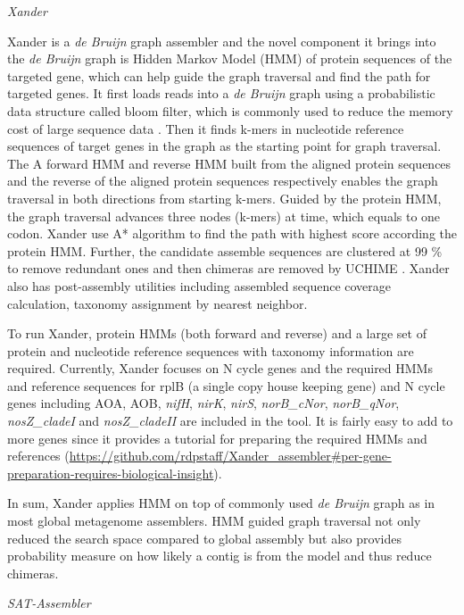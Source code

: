 \documentclass[]{msu-thesis}
\begin{document}
\textit{Xander}

Xander is a \textit{de Bruijn} graph assembler and the novel component
it brings into the \textit{de Bruijn} graph is Hidden Markov Model
(HMM) of protein sequences of the targeted gene, which can help guide
the graph traversal and find the path for targeted genes. It first
loads reads into a \textit{de Bruijn} graph using a probabilistic data
structure called bloom filter, which is commonly used to reduce the
memory cost of large sequence data \cite{pell_scaling_2012}. Then it
finds k-mers in nucleotide reference sequences of target genes in the
graph as the starting point for graph traversal. The A forward HMM and
reverse HMM built from the aligned protein sequences and the reverse
of the aligned protein sequences respectively enables the graph
traversal in both directions from starting k-mers. Guided by the
protein HMM, the graph traversal advances three nodes (k-mers) at
time, which equals to one codon. Xander use A* algorithm to find the
path with highest score according the protein HMM. Further, the
candidate assemble sequences are clustered at 99 \% to remove
redundant ones and then chimeras are removed by UCHIME
\cite{edgar_uchime_2011}. Xander also has post-assembly utilities
including assembled sequence coverage calculation, taxonomy assignment
by nearest neighbor.

To run Xander, protein HMMs (both forward and reverse) and a large set
of protein and nucleotide reference sequences with taxonomy
information are required. Currently, Xander focuses on N cycle genes
and the required HMMs and reference sequences for rplB (a single copy
house keeping gene) and N cycle genes including AOA, AOB,
\textit{nifH}, \textit{nirK}, \textit{nirS}, \textit{norB\_cNor},
\textit{norB\_qNor}, \textit{nosZ\_cladeI} and \textit{nosZ\_cladeII}
are included in the tool. It is fairly easy to add to more genes since
it provides a tutorial for preparing the required HMMs and references
(\url{https://github.com/rdpstaff/Xander\_assembler\#per-gene-preparation-requires-biological-insight}).

In sum, Xander applies HMM on top of commonly used \textit{de Bruijn}
graph as in most global metagenome assemblers. HMM guided graph
traversal not only reduced the search space compared to global
assembly but also provides probability measure on how likely a contig
is from the model and thus reduce chimeras.

\textit{SAT-Assembler}
\end{document}
